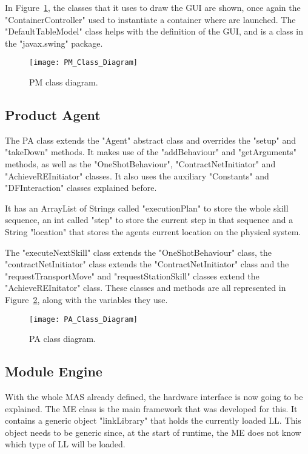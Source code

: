 In Figure~\ref{fig:pm_class_diagram}, the classes that it uses to draw the \acrshort{GUI} are shown, once again the "ContainerController" used to instantiate a container where  are launched. The "DefaultTableModel" class helps with the definition of the \acrshort{GUI}, and is a class in the "javax.swing" package.

\begin{figure}[h!]
	\centering
	\texttt{[image: PM\_Class\_Diagram]}
	\caption{\acrlong{PM} class diagram.}
	\label{fig:pm_class_diagram}
\end{figure}

\subsection{Product Agent}
\label{subsec:product_agent}

The \acrlong{PA} class extends the "Agent" abstract class and overrides the "setup" and "takeDown" methods. It makes use of the "addBehaviour" and "getArguments" methods, as well as the "OneShotBehaviour", "ContractNetInitiator" and "AchieveREInitiator" classes. It also uses the auxiliary "Constants" and "DFInteraction" classes explained before.

It has an ArrayList of Strings called "executionPlan" to store the whole skill sequence, an int called "step" to store the current step in that sequence and a String "location" that stores the agents current location on the physical system.

The "executeNextSkill" class extends the "OneShotBehaviour" class, the "contractNetInitiator" class extends the "ContractNetInitiator" class and the "requestTransportMove" and "requestStationSkill" classes extend the "AchieveREInitator" class. These classes and methods are all represented in Figure~\ref{fig:pa_class_diagram}, along with the variables they use.

\begin{figure}[h!]
	\centering
	\texttt{[image: PA\_Class\_Diagram]}
	\caption{\acrlong{PA} class diagram.}
	\label{fig:pa_class_diagram}
\end{figure}

\subsection{Module Engine}
\label{subsec:module_engine}

With the whole \acrshort{MAS} already defined, the hardware interface is now going to be explained. The \acrlong{ME} class is the main framework that was developed for this. It contains a generic object "linkLibrary" that holds the currently loaded \acrlong{LL}. This object needs to be generic since, at the start of runtime, the \acrshort{ME} does not know which type of \acrshort{LL} will be loaded.

